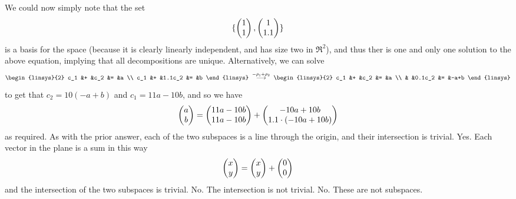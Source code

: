 \begin{exercises}
\begin{answer}
\begin{exparts}
           We could now simply note that the set
           \begin{equation*}
             \mbox{$\{\begin{pmatrix} 1 \\ 1 \end{pmatrix},\begin{pmatrix} 1 \\ 1.1 \end{pmatrix}\}$}
           \end{equation*}
           is a basis for the space (because it is clearly linearly
           independent, and has size two in $\Re^2$), and thus ther is one and
           only one solution to the above equation, implying that all
           decompositions are unique.
           Alternatively, we can solve
           \begin{equation*}
             \begin{linsys}{2}
               c_1  &+  &c_2    &=  &a  \\
               c_1  &+  &1.1c_2 &=  &b
             \end{linsys}
             \;\grstep{-\rho_1+\rho_2}\;
             \begin{linsys}{2}
               c_1  &+  &c_2    &=  &a  \\
                    &   &0.1c_2 &=  &-a+b
             \end{linsys}
           \end{equation*}
           to get that $c_2=10(-a+b)$ and $c_1=11a-10b$, and so we have
           \begin{equation*}
             \begin{pmatrix} a \\ b \end{pmatrix}=\begin{pmatrix} 11a-10b \\ 11a-10b \end{pmatrix}
                             +\begin{pmatrix} -10a+10b \\ 1.1\cdot(-10a+10b) \end{pmatrix}
           \end{equation*}
           as required.
           As with the prior answer, each of the two subspaces is a line
           through the origin, and their intersection is trivial.
         \partsitem Yes.
           Each vector in the plane is a sum in this way
           \begin{equation*}
             \begin{pmatrix} x \\ y \end{pmatrix}=\begin{pmatrix} x \\ y \end{pmatrix}+\begin{pmatrix} 0 \\ 0 \end{pmatrix}
           \end{equation*}
           and the intersection of the two subspaces is trivial.
         \partsitem No.
           The intersection is not trivial.
         \partsitem No. 
           These are not subspaces.
      \end{exparts}  
    \end{answer}

\end{exercises}
